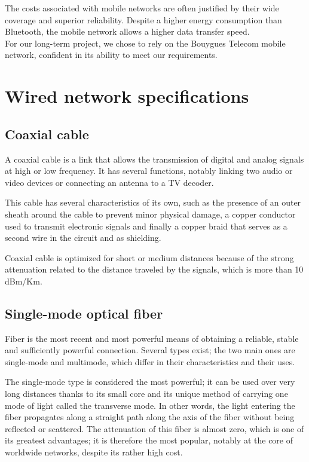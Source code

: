 \documentclass[12]{article}
\begin{document}
The costs associated with mobile networks are often justified by their wide coverage and superior reliability. Despite a higher energy consumption than Bluetooth, the mobile network allows a higher data transfer speed.\\

For our long-term project, we chose to rely on the Bouygues Telecom mobile network, confident in its ability to meet our requirements.



\section{Wired network specifications}

\subsection{Coaxial cable}

A coaxial cable is a link that allows the transmission of digital and analog signals at high or low frequency. It has several functions, notably linking two audio or video devices or connecting an antenna to a TV decoder.

This cable has several characteristics of its own, such as the presence of an outer sheath around the cable to prevent minor physical damage, a copper conductor used to transmit electronic signals and finally a copper braid that serves as a second wire in the circuit and as shielding.

Coaxial cable is optimized for short or medium distances because of the strong attenuation related to the distance traveled by the signals, which is more than 10 dBm/Km.

\subsection{Single-mode optical fiber}

Fiber is the most recent and most powerful means of obtaining a reliable, stable and sufficiently powerful connection. Several types exist; the two main ones are single-mode and multimode, which differ in their characteristics and their uses.

The single-mode type is considered the most powerful; it can be used over very long distances thanks to its small core and its unique method of carrying one mode of light called the transverse mode. In other words, the light entering the fiber propagates along a straight path along the axis of the fiber without being reflected or scattered.
The attenuation of this fiber is almost zero, which is one of its greatest advantages; it is therefore the most popular, notably at the core of worldwide networks, despite its rather high cost.
\end{document}
